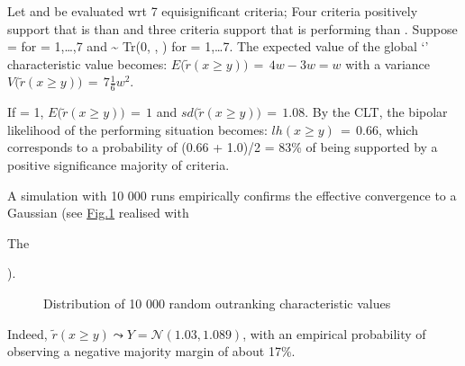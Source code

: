 \documentclass[a4paper,12pt,english]{sphinxhowto}
\let\sphinxpxdimen\pdfpxdimen\else\newdimen\sphinxpxdimen
\begin{document}
\sphinxAtStartPar
Let  and  be evaluated wrt 7 equisignificant criteria; Four criteria positively support that  is  than  and three criteria support that  is  performing than . Suppose  =  for  = 1,…,7 and  \textasciitilde{} Tr(0, , ) for  = 1,…7. The expected value of the global ‘’ characteristic value becomes: \(E\big(\tilde{r}(x \geq y)\big)\, = \, 4w - 3w = w\) with a variance \(V\big(\tilde{r}(x \geq y)\big)\,=\, 7\frac{1}{6}w^2\).

\sphinxAtStartPar
If  = 1, \(E\big(\tilde{r}(x \geq y)\big)\, = \, 1\) and \(sd\big(\tilde{r}(x \geq y)\big)\,=\, 1.08\). By the CLT, the bipolar likelihood of the  performing situation becomes: \(lh(x \geq y)\,=\, 0.66\), which corresponds to a probability of (0.66 + 1.0)/2 = 83\% of being supported by a positive significance majority of criteria.

\sphinxAtStartPar
A  simulation with 10 000 runs empirically confirms the effective convergence to a Gaussian (see \hyperref[\detokenize{pearls:simullikelihood}]{Fig.\@ \ref{\detokenize{pearls:simullikelihood}}} realised with  %
\begin{footnote}[4]\sphinxAtStartFootnote
The  
%
\end{footnote} ).

\begin{figure}[H]
\centering
\capstart

\noindent\sphinxincludegraphics[width=550\sphinxpxdimen]{{simulLikelihood}.png}
\caption{Distribution of 10 000 random outranking characteristic values}\label{\detokenize{pearls:simullikelihood}}\end{figure}

\sphinxAtStartPar
Indeed, \(\tilde{r}(x \geq y) \leadsto Y = \mathcal{N}(1.03,1.089)\), with an empirical probability of observing a negative majority margin of about 17\%.
\end{document}
